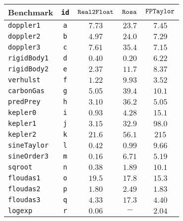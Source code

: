 \begin{tabular}{p{2.3cm}cccc}
\hline
\multirow{1}{*}{Benchmark} & \texttt{id} & $\mathtt{Real2Float}$ & $\mathtt{Rosa}$  & $\mathtt{FPTaylor}$   \\
\hline
\multirow{1}{*}{\texttt{doppler1}} & \texttt{a} &
$7.73$ & $23.7$ & $\mathbf{7.45}$\\
\multirow{1}{*}{\texttt{doppler2}} & \texttt{b} &
$\mathbf{4.97}$ & $24.0$ & $7.29$\\
\multirow{1}{*}{\texttt{doppler3}} & \texttt{c} &
$7.61$ & $35.4$ & $\mathbf{7.15}$\\
\multirow{1}{*}{\texttt{rigidBody1}} & \texttt{d} &
$0.40$ & $\mathbf{0.20}$ & $6.22$ \\
\multirow{1}{*}{\texttt{rigidBody2}} & \texttt{e} &
$\mathbf{2.37}$ & $11.7$ & $8.37$ \\
\multirow{1}{*}{\texttt{verhulst}} & \texttt{f} &
$\mathbf{1.22}$ & $9.93$ & $3.52$\\
\multirow{1}{*}{\texttt{carbonGas}} & \texttt{g} &
$\mathbf{5.05}$ & $39.4$ & $10.1$\\
\multirow{1}{*}{\texttt{predPrey}} & \texttt{h} &
$\mathbf{3.10}$ & $36.2$ & $5.05$\\
\multirow{1}{*}{\texttt{kepler0}} & \texttt{i} &
$\mathbf{0.93}$ & $4.28$ & $15.1$\\
\multirow{1}{*}{\texttt{kepler1}} & \texttt{j} &
$\mathbf{3.15}$ & $32.9$ & $98.0$\\
\multirow{1}{*}{\texttt{kepler2}} & \texttt{k} &
$\mathbf{21.6}$ & $56.1$ & $ 215$\\
\multirow{1}{*}{\texttt{sineTaylor}} & \texttt{l} &
$\mathbf{0.42}$ & $0.99$ & $9.66$ \\
\multirow{1}{*}{\texttt{sineOrder3}} & \texttt{m} &
$\mathbf{0.16}$ & $6.71$ & $5.19$\\
\multirow{1}{*}{\texttt{sqroot}} & \texttt{n} &
$\mathbf{0.38}$ & $1.89$ & $10.1$\\
\multirow{1}{*}{\texttt{floudas1}} & \texttt{o} &
$19.5$ & $17.8$ & $\mathbf{15.3}$\\
\multirow{1}{*}{\texttt{floudas2}} & \texttt{p} &
$\mathbf{1.80}$ & $2.49$ & $1.83$\\
\multirow{1}{*}{\texttt{floudas3}} & \texttt{q} &
$\mathbf{4.33}$ & $17.3$ & $4.40$\\
\multirow{1}{*}{\texttt{logexp}} & \texttt{r} &
$\mathbf{0.06}$ & $-$ & $2.04$\\

\end{tabular}
